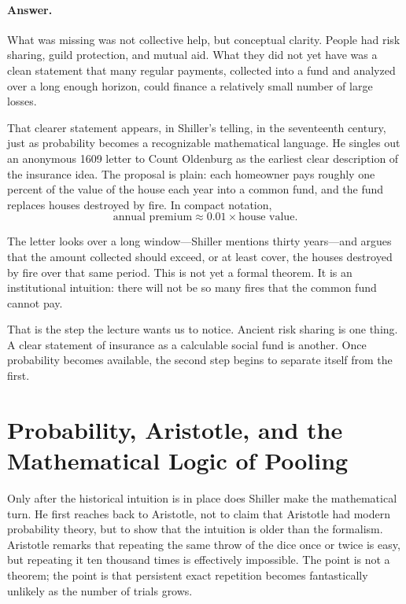 \paragraph{Answer.} What was missing was not collective help, but conceptual clarity. People had risk sharing, guild protection, and mutual aid. What they did not yet have was a clean statement that many regular payments, collected into a fund and analyzed over a long enough horizon, could finance a relatively small number of large losses.

That clearer statement appears, in Shiller's telling, in the seventeenth century, just as probability becomes a recognizable mathematical language. He singles out an anonymous 1609 letter to Count Oldenburg as the earliest clear description of the insurance idea. The proposal is plain: each homeowner pays roughly one percent of the value of the house each year into a common fund, and the fund replaces houses destroyed by fire. In compact notation,
\begin{equation}
\text{annual premium} \approx 0.01 \times \text{house value}.
\end{equation}

The letter looks over a long window---Shiller mentions thirty years---and argues that the amount collected should exceed, or at least cover, the houses destroyed by fire over that same period. This is not yet a formal theorem. It is an institutional intuition: there will not be so many fires that the common fund cannot pay.

That is the step the lecture wants us to notice. Ancient risk sharing is one thing. A clear statement of insurance as a calculable social fund is another. Once probability becomes available, the second step begins to separate itself from the first.

\section{Probability, Aristotle, and the Mathematical Logic of Pooling}

Only after the historical intuition is in place does Shiller make the mathematical turn. He first reaches back to Aristotle, not to claim that Aristotle had modern probability theory, but to show that the intuition is older than the formalism. Aristotle remarks that repeating the same throw of the dice once or twice is easy, but repeating it ten thousand times is effectively impossible. The point is not a theorem; the point is that persistent exact repetition becomes fantastically unlikely as the number of trials grows.

